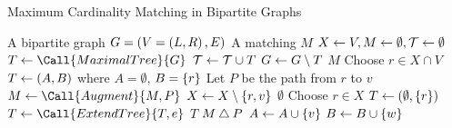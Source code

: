 \begin{algorithm}[!h]
    \caption{Maximum Cardinality Matching in Bipartite Graphs} \label{alg:max_card_match_bipartite}
    \begin{algorithmic}[1]
        \Algin A bipartite graph $G = \left( V = \left( L, R \right) , E \right)$
        \Algout A matching $M$ 
        \State $X \gets V, M \gets \emptyset, \mathcal{T} \gets \emptyset$ 
         \label{line:max_card_bi_while}
            \State $T \gets \Call{MaximalTree}{G}$%
            \State $\mathcal{T} \gets \mathcal{T} \cup T$%
            \State $G \gets G \setminus T$ 
        \EndWhile
        \State \Return $M$
        \Statex
            \State Choose $r \in X \cap V$ 
            \State $T \gets \left( A, B \right)$ where $A = \emptyset$, $B = \left\{ r \right\}$  
                 
                    \State Let $P$ be the path from $r$ to $v$
                    \State $M \gets \Call{Augment}{M, P}$
                    \State $X \gets X \setminus \left\{ r, v \right\}$ 
                        \State \Return $\emptyset$ %
                    \Else 
                        \State Choose $r \in X$ 
                        \State $T \gets \left( \emptyset, \left\{ r \right\} \right)$ 
                    \EndIf
                \Else
                    \State $T \gets \Call{ExtendTree}{T, e}$
                \EndIf
            \EndWhile
            \State \Return $T$ %
        \EndFunction
        \Statex
            \State \Return $ M \bigtriangleup P$
        \EndProcedure
        \Statex
                \State $A \gets A \cup \left\{ v \right\}$
                \State $B \gets B \cup \left\{ w \right\}$    
            \EndIf
        \EndProcedure
    \end{algorithmic}  
\end{algorithm}

